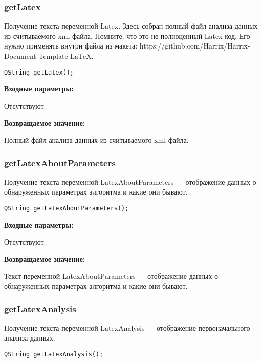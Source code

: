 \subsubsection{getLatex}\label{getLatex}

Получение текста переменной Latex. Здесь собран полный файл анализа данных из считываемого xml файла. Помните, что это не полноценный Latex код. Его нужно применять внутри файла из макета: https://github.com/Harrix/Harrix-Document-Template-LaTeX.


\begin{lstlisting}[label=code_syntax_getLatex,caption=Синтаксис]
QString getLatex();
\end{lstlisting}

\textbf{Входные параметры:}

Отсутствуют.

\textbf{Возвращаемое значение:}

Полный файл анализа данных из считываемого xml файла.


\subsubsection{getLatexAboutParameters}\label{getLatexAboutParameters}

Получение текста переменной LatexAboutParameters --- отображение данных о обнаруженных параметрах алгоритма и какие они бывают.


\begin{lstlisting}[label=code_syntax_getLatexAboutParameters,caption=Синтаксис]
QString getLatexAboutParameters();
\end{lstlisting}

\textbf{Входные параметры:}

Отсутствуют.

\textbf{Возвращаемое значение:}

Текст переменной LatexAboutParameters --- отображение данных о обнаруженных параметрах алгоритма и какие они бывают.


\subsubsection{getLatexAnalysis}\label{getLatexAnalysis}

Получение текста переменной LatexAnalysis --- отображение первоначального анализа данных.


\begin{lstlisting}[label=code_syntax_getLatexAnalysis,caption=Синтаксис]
QString getLatexAnalysis();
\end{lstlisting}


